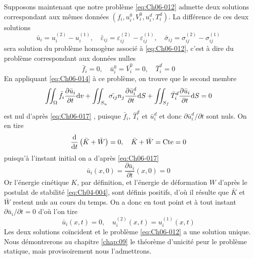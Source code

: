 Supposons maintenant que notre problème \eqref{eq:Ch06-012} admette deux solutions correspondant aux mêmes données $\left( f_i, u_i^0, V_i^0, u_i^d, T_i^d \right)$.
La différence de ces deux solutions
\begin{equation}
    \bar{u}_i = u_i^{(2)} - u_i^{(1)}, \quad \bar{\varepsilon}_{ij} = \varepsilon_{ij}^{(2)} - \varepsilon_{ij}^{(1)}, \quad  \bar{\sigma}_{ij} = \sigma_{ij}^{(2)} - \sigma_{ij}^{(1)}
    \label{eq:Ch06-016}
\end{equation}
sera solution du problème homogène associé à \eqref{eq:Ch06-012}, c'est à dire du problème correspondant aux données nulles
\begin{equation}
    \bar{f}_i = 0, \quad \bar{u}_i^0 = \bar{V}_i^0 = 0, \quad \bar{T}_i^d= 0
    \label{eq:Ch06-017}
\end{equation}
En appliquant \eqref{eq:Ch06-014} à ce problème, on trouve que le second membre
\begin{equation}
    \iint_{\Omega} \bar{f}_i \frac{\partial \bar{u}_i}{\partial t} \mathrm{d} v + \iint_{S_u} \bar{\sigma_{ij}} n_j \frac{\partial \bar{u}_i^d}{\partial t} \mathrm{d} S + \iint_{S_f} \bar{T}_i^d \frac{\partial \bar{u}_i}{\partial t} \mathrm{d} S = 0
    \label{eq:Ch06-018}
\end{equation}
est nul d'après \eqref{eq:Ch06-017} , puisque $\bar{f}_i$, $\bar{T}_i^d$ et $\bar{u}_i^d$ et donc $\partial \bar{u}_i^d/\partial t$ sont nuls.
On en tire
\begin{equation}
    \frac{\mathrm{d}}{\mathrm{d} t} \left( \bar{K} + \bar{W} \right) = 0, \quad \bar{K} + \bar{W} = \text{Cte} = 0
    \label{eq:Ch06-019}
\end{equation}
puisqu'à l'instant initial on a d'après \eqref{eq:Ch06-017}
\begin{equation}
    \bar{u}_i \left( x,0 \right) = \frac{\partial \bar{u}_i}{\partial t} \left( x,0 \right) = 0
    \label{eq:Ch06-020}
\end{equation}
Or l'énergie cinétique $K$, par définition, et l'énergie de déformation $W$ d'après le postulat de stabilité \eqref{eq:Ch04-004}, sont définis positifs, d'où il résulte que $\bar{K}$ et $\bar{W}$ restent nuls au cours du temps.
On a donc en tout point et à tout instant $\partial \bar{u}_i/\partial t = 0$ d'où l'on tire
\begin{equation}
    \bar{u}_i \left( x,t \right) = 0, \quad u_i^{(2)} \left( x,t \right) = u_i^{(1)} \left( x,t \right)
    \label{eq:Ch06-021}
\end{equation}
Les deux solutions coïncident et le problème \eqref{eq:Ch06-012} a une solution unique.
Nous démontrerons au chapitre \ref{chap:09} le théorème d'unicité peur le problème statique, mais provisoirement nous l'admettrons.

